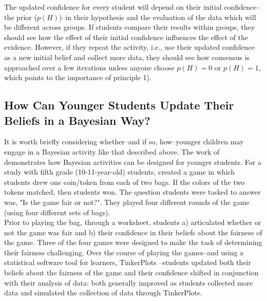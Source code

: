 \documentclass[man, floatsintext]{apa7} %
\begin{document}
The updated confidence for every student will depend on their initial confidence--the prior ($p(H)$)--in their hypothesis and the evaluation of the data which will be different across groups. If students compare their results within groups, they should see how the effect of their initial confidence influences the effect of the evidence. However, if they repeat the activity, i.e., use their updated confidence as a new initial belief and collect more data, they should see how consensus is approached over a few iterations unless anyone choose $p(H) = 0$ or $p(H) = 1$, which points to the importance of principle 1).\\

\subsection{How Can Younger Students Update Their Beliefs in a Bayesian Way?}

It is worth briefly considering whether--and if so, how--younger children may engage in a Bayesian activity like that described above. The work of \textcite{kazak2015bayesian, kazak2018emergent} demonstrates how Bayesian activities can be designed for younger students. For a study with fifth grade (10-11-year-old) students, \textcite{kazak2015bayesian} created a game in which students drew one coin/token from each of two bags. If the colors of the two tokens matched, then students won. The question students were tasked to answer was, "Is the game fair or not?". They played four different rounds of the game (using four different sets of bags). \\

Prior to playing the bag, through a worksheet, students a) articulated whether or not the game was fair and b) their confidence in their beliefs about the fairness of the game. Three of the four games were designed to make the task of determining their fairness challenging. Over the course of playing the games--and using a statistical software tool for learners, TinkerPlots \parencite{konold2005tinkerplots}--students updated both their beliefs about the fairness of the game and their confidence shifted in conjunction with their analysis of data: both generally improved as students collected more data and simulated the collection of data through TinkerPlots. \\
\end{document}
